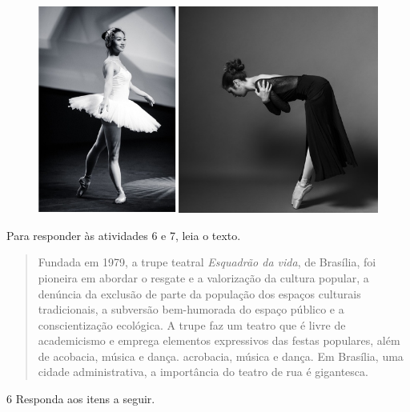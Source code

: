 \begin{figure}[htpb!]
\includegraphics[width=\textwidth]{./imgs/art15cd.png}
\end{figure}



\pagebreak
Para responder às atividades 6 e 7, leia o texto.

\begin{quote}
Fundada em 1979, a trupe teatral \emph{Esquadrão da vida}, de Brasília,
foi pioneira em abordar o resgate e a valorização da cultura popular, a
denúncia da exclusão de parte da população dos espaços culturais tradicionais,
a subversão bem-humorada do espaço público e a conscientização ecológica.
A trupe faz um teatro que é livre de academicismo e emprega elementos
expressivos das festas populares, além de acobacia, música e dança.
acrobacia, música e dança. Em Brasília, uma cidade administrativa,
a importância do teatro de rua é gigantesca.

\end{quote}

\num{6}  Responda aos itens a seguir.

